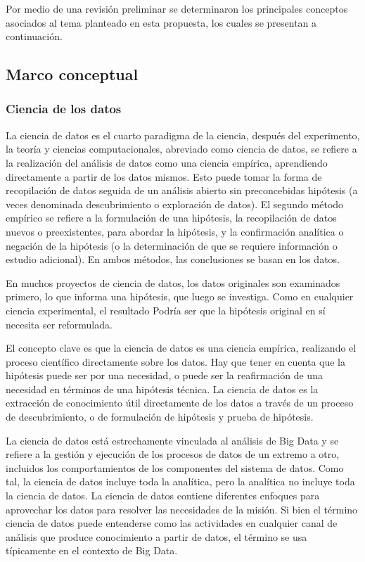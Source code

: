Por medio de una revisión preliminar se determinaron los principales conceptos asociados al tema planteado en esta propuesta, los cuales se presentan a continuación. 

\subsection{Marco conceptual}

\subsubsection{Ciencia de los datos}

La ciencia de datos es el cuarto paradigma de la ciencia, después del experimento, la teoría y ciencias computacionales, abreviado como ciencia de datos, se refiere a la realización del análisis de datos como una ciencia empírica, aprendiendo directamente a partir de los datos mismos. Esto puede tomar la forma de recopilación de datos seguida de un análisis abierto sin preconcebidas hipótesis (a veces denominada descubrimiento o exploración de datos). El segundo método empírico se refiere a la formulación de una hipótesis, la recopilación de datos nuevos o preexistentes, para abordar la hipótesis, y la confirmación analítica o negación de la hipótesis (o la determinación de que se requiere información o estudio adicional). En ambos métodos, las conclusiones se basan en los datos. 

En muchos proyectos de ciencia de datos, los datos originales son examinados primero, lo que informa una hipótesis, que luego se investiga. Como en cualquier ciencia experimental, el resultado
Podría ser que la hipótesis original en sí necesita ser reformulada. 

El concepto clave es que la ciencia de datos es una ciencia empírica, realizando el proceso científico directamente sobre los datos. Hay que tener en cuenta que la hipótesis puede ser por una necesidad, o puede ser la reafirmación de una necesidad en términos de una hipótesis técnica.
La ciencia de datos es la extracción de conocimiento útil directamente de los datos a través de un proceso de descubrimiento, o de formulación de hipótesis y prueba de hipótesis.

La ciencia de datos está estrechamente vinculada al análisis de Big Data y se refiere a la gestión y ejecución de los procesos de datos de un extremo a otro, incluidos los comportamientos de los componentes del sistema de datos. Como tal, la ciencia de datos
incluye toda la analítica, pero la analítica no incluye toda la ciencia de datos. La ciencia de datos contiene diferentes enfoques para aprovechar los datos para resolver las necesidades de la misión. Si bien el término ciencia de datos puede entenderse como las actividades en cualquier canal de análisis que produce conocimiento a partir de datos, el término se usa típicamente en el contexto de Big Data.

